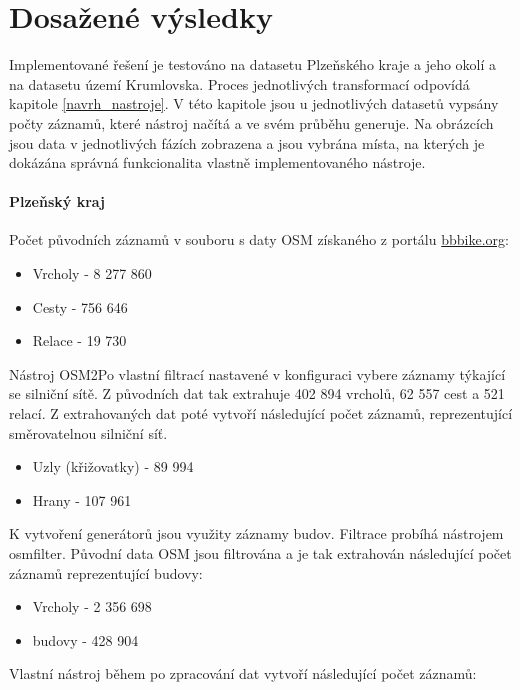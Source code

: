 \chapter{Dosažené výsledky}

Implementované řešení je testováno na datasetu Plzeňského kraje a jeho okolí a na datasetu území Krumlovska. Proces jednotlivých transformací odpovídá kapitole \ref{navrh_nastroje}. V této kapitole jsou u jednotlivých datasetů vypsány počty záznamů, které nástroj načítá a ve svém průběhu generuje. Na obrázcích jsou data v jednotlivých fázích zobrazena a jsou vybrána místa, na kterých je dokázána správná funkcionalita vlastně implementovaného nástroje.

\subsubsection{Plzeňský kraj}

Počet původních záznamů v souboru s daty OSM získaného z portálu \url{bbbike.org}:

\begin{itemize}
	\item Vrcholy - 8 277 860
	\item Cesty - 756 646
	\item Relace - 19 730
\end{itemize}

Nástroj OSM2Po vlastní filtrací nastavené v konfiguraci vybere záznamy týkající se silniční sítě. Z původních dat tak extrahuje 402 894 vrcholů, 62 557 cest a 521 relací. Z extrahovaných dat poté vytvoří následující počet záznamů, reprezentující směrovatelnou silniční síť.

\begin{itemize}
	\item Uzly (křižovatky) - 89 994
	\item Hrany - 107 961
\end{itemize}

K vytvoření generátorů jsou využity záznamy budov. Filtrace probíhá nástrojem osmfilter. Původní data OSM jsou filtrována a je tak extrahován následující počet záznamů reprezentující budovy: 

\begin{itemize}
	\item Vrcholy - 2 356 698
	\item budovy - 428 904
\end{itemize}

Vlastní nástroj během po zpracování dat vytvoří následující počet záznamů:

